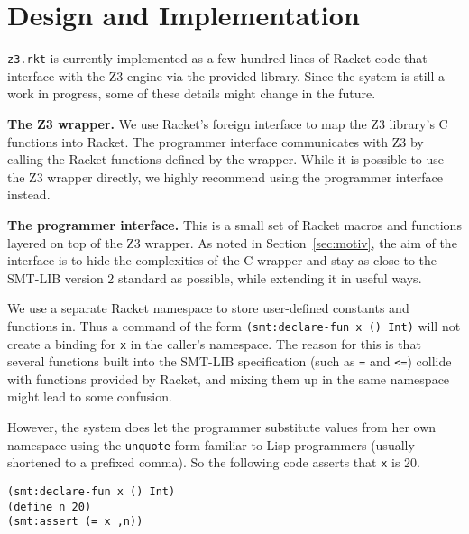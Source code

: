 \section{Design and Implementation}

\texttt{z3.rkt} is currently implemented as a few hundred lines of Racket code
that interface with the Z3 engine via the provided library. Since the system is
still a work in progress, some of these details might change in the future.

\textbf{The Z3 wrapper.} We use Racket's foreign interface \cite{racket/foreign}
to map the Z3 library's C functions into Racket. The programmer interface
communicates with Z3 by calling the Racket functions defined by the
wrapper. While it is possible to use the Z3 wrapper directly, we highly
recommend using the programmer interface instead.

\textbf{The programmer interface.} This is a small set of Racket macros and
functions layered on top of the Z3 wrapper. As noted in Section~\ref{sec:motiv},
the aim of the interface is to hide the complexities of the C wrapper and stay
as close to the SMT-LIB version 2 standard \cite{smtlib2:10} as possible, while
extending it in useful ways.

We use a separate Racket namespace to store user-defined constants and functions
in. Thus a command of the form \texttt{(smt:declare-fun x () Int)} will not
create a binding for \texttt{x} in the caller's namespace. The reason for this
is that several functions built into the SMT-LIB specification (such as
\texttt{=} and \texttt{<=}) collide with functions provided by Racket, and
mixing them up in the same namespace might lead to some confusion.

However, the system does let the programmer substitute values from her own
namespace using the \texttt{unquote} form familiar to Lisp programmers (usually
shortened to a prefixed comma). So the following code asserts that \texttt{x} is
20.

\begin{verbatim}
(smt:declare-fun x () Int)
(define n 20)
(smt:assert (= x ,n))
\end{verbatim} 

